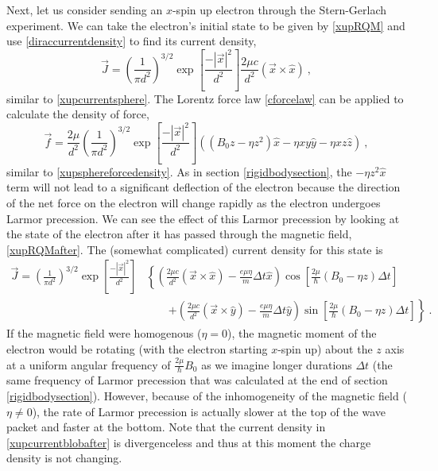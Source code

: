 \documentclass[12pt,secnumarabic,amsmath,amssymb,balancelastpage,nofootinbib]{article}
\begin{document}
Next, let us consider sending an $x$-spin up electron through the Stern-Gerlach experiment.  We can take the electron's initial state to be given by \eqref{xupRQM} and use \eqref{diraccurrentdensity} to find its current density,
\begin{equation}
\vec{J}=\left(\frac{1}{\pi d^2}\right)^{3/2} \exp\left[\frac{-|\vec{x}|^2}{d^2}\right] \frac{2 \mu c}{d^2} (\vec{x} \times \hat{x})
\ ,
\label{xupcurrentblob}
\end{equation}
similar to \eqref{xupcurrentsphere}.  The Lorentz force law \eqref{cforcelaw} can be applied to calculate the density of force,
\begin{equation}
\vec{f}=\frac{2\mu}{d^2}\left(\frac{1}{\pi d^2}\right)^{3/2} \exp\left[\frac{-|\vec{x}|^2}{d^2}\right] \left( (B_0 z - \eta z^2) \hat{x} - \eta x y \hat{y} - \eta x z \hat{z} \right)
\ ,
\label{xupforcedensityblob}
\end{equation}
similar to \eqref{xupsphereforcedensity}.  As in section \ref{rigidbodysection}, the $- \eta z^2 \hat{x}$ term will not lead to a significant deflection of the electron because the direction of the net force on the electron will change rapidly as the electron undergoes Larmor precession.  We can see the effect of this Larmor precession by looking at the state of the electron after it has passed through the magnetic field, \eqref{xupRQMafter}.  The (somewhat complicated) current density for this state is
\begin{align}
\vec{J}=\left(\frac{1}{\pi d^2}\right)^{3/2} \exp\left[\frac{-|\vec{x}|^2}{d^2}\right]&\left\{ \left(\frac{2 \mu c}{d^2} (\vec{x} \times \hat{x}) - \frac{e \mu \eta}{m}\Delta t \hat{x} \right)\cos\left[\frac{2 \mu}{\hbar} (B_0 - \eta z)\Delta t\right] \right.
\nonumber
\\
&\quad\quad\left.+\left(\frac{2 \mu c}{d^2} (\vec{x} \times \hat{y}) - \frac{e \mu \eta}{m}\Delta t \hat{y} \right)\sin\left[\frac{2 \mu}{\hbar} (B_0 - \eta z)\Delta t\right]\right\}
\ .
\label{xupcurrentblobafter}
\end{align}
If the magnetic field were homogenous ($\eta=0$), the magnetic moment of the electron would be rotating (with the electron starting $x$-spin up) about the $z$ axis at a uniform angular frequency of $\frac{2\mu}{\hbar} B_0$ as we imagine longer durations $\Delta t$ (the same frequency of Larmor precession that was calculated at the end of section \ref{rigidbodysection}).  However, because of the inhomogeneity of the magnetic field ($\eta \neq 0$), the rate of Larmor precession is actually slower at the top of the wave packet and faster at the bottom.  Note that the current density in \eqref{xupcurrentblobafter} is divergenceless and thus at this moment the charge density is not changing.
\end{document}
